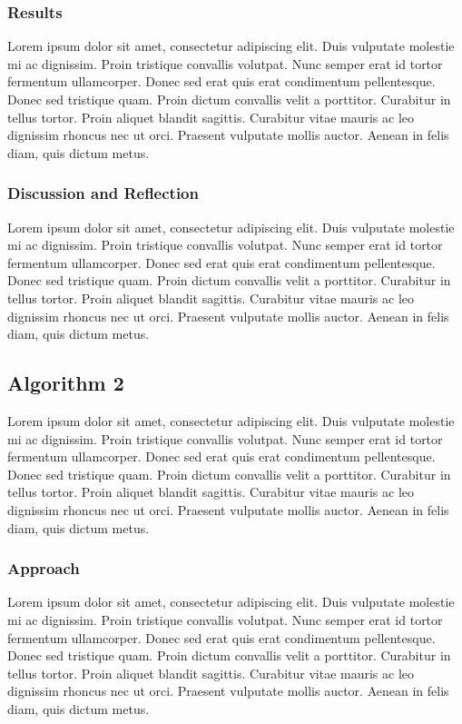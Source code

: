 \documentclass[11pt]{article}
\begin{document}
\subsubsection{Results}
Lorem ipsum dolor sit amet, consectetur adipiscing elit. Duis vulputate molestie mi ac dignissim. Proin tristique convallis volutpat. Nunc semper erat id tortor fermentum ullamcorper. Donec sed erat quis erat condimentum pellentesque. Donec sed tristique quam. Proin dictum convallis velit a porttitor. Curabitur in tellus tortor. Proin aliquet blandit sagittis. Curabitur vitae mauris ac leo dignissim rhoncus nec ut orci. Praesent vulputate mollis auctor. Aenean in felis diam, quis dictum metus.

\subsubsection{Discussion and Reflection}
Lorem ipsum dolor sit amet, consectetur adipiscing elit. Duis vulputate molestie mi ac dignissim. Proin tristique convallis volutpat. Nunc semper erat id tortor fermentum ullamcorper. Donec sed erat quis erat condimentum pellentesque. Donec sed tristique quam. Proin dictum convallis velit a porttitor. Curabitur in tellus tortor. Proin aliquet blandit sagittis. Curabitur vitae mauris ac leo dignissim rhoncus nec ut orci. Praesent vulputate mollis auctor. Aenean in felis diam, quis dictum metus.


\subsection{Algorithm 2}
Lorem ipsum dolor sit amet, consectetur adipiscing elit. Duis vulputate molestie mi ac dignissim. Proin tristique convallis volutpat. Nunc semper erat id tortor fermentum ullamcorper. Donec sed erat quis erat condimentum pellentesque. Donec sed tristique quam. Proin dictum convallis velit a porttitor. Curabitur in tellus tortor. Proin aliquet blandit sagittis. Curabitur vitae mauris ac leo dignissim rhoncus nec ut orci. Praesent vulputate mollis auctor. Aenean in felis diam, quis dictum metus.

\subsubsection{Approach}
Lorem ipsum dolor sit amet, consectetur adipiscing elit. Duis vulputate molestie mi ac dignissim. Proin tristique convallis volutpat. Nunc semper erat id tortor fermentum ullamcorper. Donec sed erat quis erat condimentum pellentesque. Donec sed tristique quam. Proin dictum convallis velit a porttitor. Curabitur in tellus tortor. Proin aliquet blandit sagittis. Curabitur vitae mauris ac leo dignissim rhoncus nec ut orci. Praesent vulputate mollis auctor. Aenean in felis diam, quis dictum metus.
\end{document}

